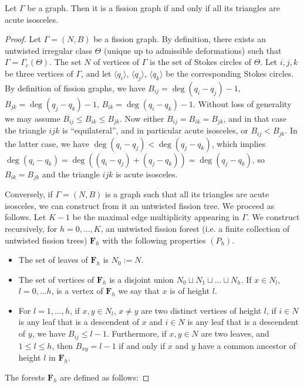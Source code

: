 \documentclass[10pt,a4paper]{amsart}
\begin{document}
\begin{theorem}\label{thm:characterisation_fission_graphs}
Let $\Gamma$ be a graph. Then it is a fission graph if and only if all its triangles are acute isosceles. 
\end{theorem}

\begin{proof}
Let $\Gamma=(N, B)$ be a fission graph. By definition, there exists an untwisted irregular class $\Theta$ (unique up to admissible deformations) such that $\Gamma=\Gamma_c(\Theta)$. The set $N$  of vertices of $\Gamma$ is the set of Stokes circles of $\Theta$. 
Let $i, j, k$ be three vertices of $\Gamma$, and let $\langle q_i\rangle$, $\langle q_j \rangle$, $\langle q_k \rangle$ be the corresponding Stokes circles. By definition of fission graphs, we have $B_{ij}=\deg(q_i-q_j)-1$, $B_{jk}=\deg(q_j-q_k)-1$, $B_{ik}=\deg(q_i-q_k)-1$. Without loss of generality we may assume $B_{ij}\leq B_{ik}\leq B_{jk}$. Now either $B_{ij}=B_{ik}=B_{jk}$, and in that case the triangle $ijk$ is ``equilateral'', and in particular acute isosceles, or $B_{ij}<B_{jk}$. In the latter case, we have $\deg(q_i-q_j)<\deg(q_j-q_k)$, which implies $\deg(q_i-q_k)=\deg((q_i-q_j)+(q_j-q_k))=\deg(q_j-q_k)$, so $B_{ik}=B_{jk}$ and the triangle $ijk$ is acute isosceles. 


Conversely, if $\Gamma=(N, B)$ is a graph such that all its triangles are acute isosceles, we can construct from it an untwisted fission tree. We proceed as follows.  Let $K-1$ be the maximal edge multiplicity appearing in $\Gamma$. We construct recursively, for $h=0, \dots, K$, an untwisted fission forest (i.e. a finite collection of untwisted fission trees) $\mathbf F_h$ with the following properties $(P_h)$. 
\begin{itemize}
\item The set of leaves of $\mathbf F_h$ is $N_0:=N$. 
\item The set of vertices of $\mathbf F_h$ is a disjoint union $N_0\sqcup N_1 \sqcup \dots \sqcup N_h$. If $x\in N_l$, $l=0, \dots h$, is a vertex of $\mathbf F_h$ we say that $x$ is of height $l$. 
\item For $l=1,\dots, h$, if $x, y\in N_l$, $x\neq y$ are two distinct vertices of height $l$, if $i\in N$ is any leaf that is a descendent of $x$ and $i\in N$ is any leaf that is a descendent of $y$, we have $B_{ij}\leq l-1$. Furthermore, if $x,y\in N$ are two leaves, and $1\leq l\leq h$, then $B_{xy}=l-1$ if and only if $x$ and $y$ have a common ancestor of height $l$ in $\mathbf F_h$. 
\end{itemize}
The forests $\mathbf F_h$ are defined as follows:



\end{proof}
\end{document}
